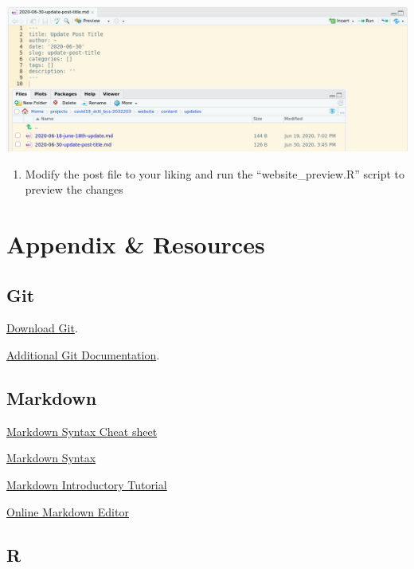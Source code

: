 \documentclass[
]{book}
\providecommand{\tightlist}{%
  \setlength{\itemsep}{0pt}\setlength{\parskip}{0pt}}
\begin{document}
\includegraphics{images/04-newpost_1.png}

\begin{enumerate}
\def\labelenumi{\arabic{enumi}.}
\setcounter{enumi}{2}
\tightlist
\item
  Modify the post file to your liking and run the ``website\_preview.R'' script to preview the changes
\end{enumerate}

\hypertarget{appendix-resources}{%
\chapter*{Appendix \& Resources}\label{appendix-resources}}

\hypertarget{git}{%
\section*{Git}\label{git}}

\href{https://git-scm.com/downloads}{Download Git}.

\href{https://git-scm.com/doc}{Additional Git Documentation}.

\hypertarget{markdown}{%
\section*{Markdown}\label{markdown}}

\href{https://www.markdownguide.org/cheat-sheet/}{Markdown Syntax Cheat sheet}

\href{https://www.markdownguide.org/basic-syntax}{Markdown Syntax}

\href{https://www.markdowntutorial.com/lesson/1/}{Markdown Introductory Tutorial}

\href{https://markdown-editor.github.io/}{Online Markdown Editor}

\hypertarget{r}{%
\section*{R}\label{r}}
\end{document}
